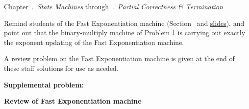 \documentclass[handout]{mcs}
\begin{document}

\begin{staffnotes}
Chapter~.\ \emph{State Machines}
through~.\ \emph{Partial Correctness \&
  Termination}
\end{staffnotes}


\begin{staffnotes}
Remind students of the Fast Exponentiation machine
(Section~ and
\href{https://courses.csail.mit.edu/6.042/spring16/slidepdfs/state-machines.pdf}{slides}),
and point out that the binary-multiply machine of Problem 1 is
carrying out exactly the exponent updating of the Fast Exponentiation
machine.

A review problem on the Fast Exponentiation machine is given at the
end of these staff solutions for use as needed.
\end{staffnotes}





\textbf{Supplemental problem:}


\begin{staffnotes}

\begin{center}
\textbf{Review of Fast Exponentiation machine}
\end{center}


\end{staffnotes}

\end{document}
